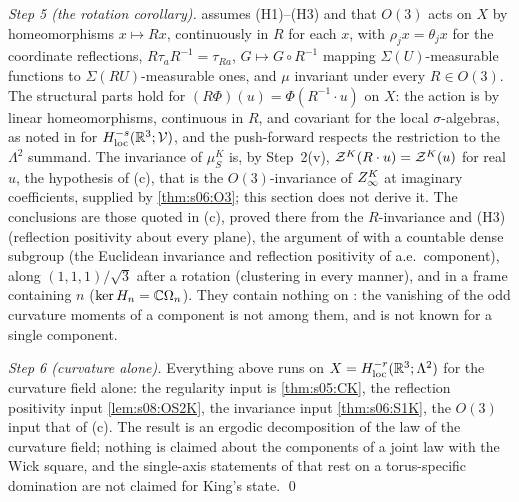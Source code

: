 \emph{Step 5 (the rotation corollary).} \cite[Cor.~10.44]{SymPhase} assumes (H1)--(H3) and that $O(3)$ acts on $X$ by homeomorphisms $x\mapsto Rx$, continuously in $R$ for each $x$, with $\rho_jx=\theta_jx$ for the coordinate reflections, $R\tau_aR^{-1}=\tau_{Ra}$, $G\mapsto G\circ R^{-1}$ mapping $\Sigma(U)$-measurable functions to $\Sigma(RU)$-measurable ones, and $\mu$ invariant under every $R\in O(3)$. The structural parts hold for $(R\Phi)(u)=\Phi(R^{-1}\cdot u)$ on $X$: the action is by linear homeomorphisms, continuous in $R$, and covariant for the local $\sigma$-algebras, as noted in \cite[Rem.~10.45(1)]{SymPhase} for $H^{-s}_{\mathrm{loc}}(\mathbb R^3;\mathcal V)$, and the push-forward respects the restriction to the $\Lambda^2$ summand. The invariance of $\mu^K_S$ is, by Step~2(v), $\mathcal Z^K(R\cdot u)=\mathcal Z^K(u)$ for real $u$, the hypothesis of (c), that is the $O(3)$-invariance of $Z^{K}_{\infty}$ at imaginary coefficients, supplied by \cref{thm:s06:O3}; this section does not derive it. The conclusions are those quoted in (c), proved there from the $R$-invariance and (H3) (reflection positivity about every plane), the argument of \cite[Thm.~10.10]{SymPhase} with a countable dense subgroup (the Euclidean invariance and reflection positivity of a.e.\ component), \cite[Thm.~10.20]{SymPhase} along $(1,1,1)/\sqrt3$ after a rotation (clustering in every manner), and \cite[Prop.~10.41(a)]{SymPhase} in a frame containing $n$ ($\ker H_n=\mathbb C\Omega_n$). They contain nothing on \OSth: the vanishing of the odd curvature moments of a component is not among them, and is not known for a single component.

\emph{Step 6 (curvature alone).} Everything above runs on $X=H^{-r}_{\mathrm{loc}}(\mathbb R^3;\Lambda^2)$ for the curvature field alone: the regularity input is \cref{thm:s05:CK}, the reflection positivity input \cref{lem:s08:OS2K}, the invariance input \cref{thm:s06:S1K}, the $O(3)$ input that of (c). The result is an ergodic decomposition of the law of the curvature field; nothing is claimed about the components of a joint law with the Wick square, and the single-axis statements of \cite{SymPhase} that rest on a torus-specific domination are not claimed for King's state. \qed

